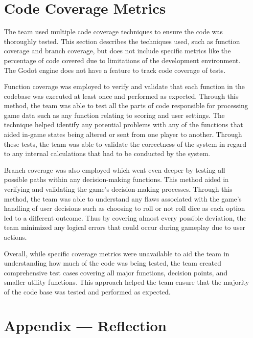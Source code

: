 \documentclass[12pt, titlepage]{article}
\begin{document}
\newpage
\section{Code Coverage Metrics}

The team used multiple code coverage techniques to ensure the code was thoroughly tested. This section describes the techniques used, such as function coverage and branch coverage, but does not include specific metrics like the percentage of code covered due to limitations of the development environment. The Godot engine does not have a feature to track code coverage of tests.

Function coverage was employed to verify and validate that each function in the codebase was executed at least once and performed as expected. Through this method, the team was able to test all the parts of code responsible for processing game data such as any function relating to scoring and user settings. The technique helped identify any potential problems with any of the functions that aided in-game states being altered or sent from one player to another. Through these tests, the team was able to validate the correctness of the system in regard to any internal calculations that had to be conducted by the system.  

Branch coverage was also employed which went even deeper by testing all possible paths within any decision-making functions. This method aided in verifying and validating the game's decision-making processes. Through this method, the team was able to understand any flaws associated with the game's handling of user decisions such as choosing to roll or not roll dice as each option led to a different outcome.  Thus by covering almost every possible deviation, the team minimized any logical errors that could occur during gameplay due to user actions.

Overall, while specific coverage metrics were unavailable to aid the team in understanding how much of the code was being tested, the team created comprehensive test cases covering all major functions, decision points, and smaller utility functions. This approach helped the team ensure that the majority of the code base was tested and performed as expected.




\newpage{}
\section*{Appendix --- Reflection}
\end{document}
